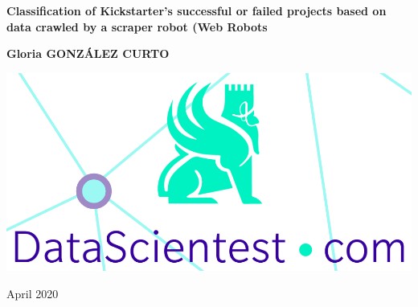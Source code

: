 \documentclass[10pt,english, openany]{book}
\renewcommand{\linespread}{1.3}
\begin{document}

\begin{titlepage}
	\clearpage\thispagestyle{empty}
	\renewcommand{\linespread}{1.6}
	\centering
	\vspace{1cm}

		\vspace{4cm}
	{\Huge \textbf{Classification of Kickstarter's successful or failed projects based on data crawled by a scraper robot (Web Robots}} \\
	\vspace{7cm}
	{\large \textbf{Gloria GONZÁLEZ CURTO} \par}
	\vspace{4cm}
    
    \centering \includegraphics[scale=0.2]{logo1.png}
    
    \vspace{0.5cm}
		
	{\normalsize April 2020 \par}
	
	\pagebreak

\end{titlepage}

\tableofcontents{}

\mainmatter
\end{document}
